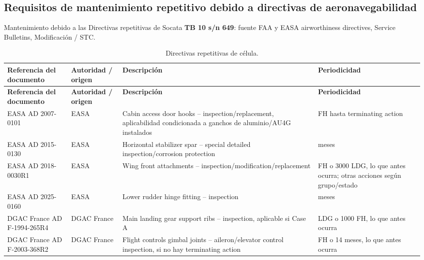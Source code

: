 \documentclass[12pt]{article}
\newcommand{\FH}{FH}
\newcommand{\LDG}{LDG}
\begin{document}
\subsection{Requisitos de mantenimiento repetitivo debido a directivas de aeronavegabilidad}
\label{subsec:ads}

Mantenimiento debido a las Directivas repetitivas de Socata \textbf{TB 10 s/n 649}: fuente FAA y EASA airworthiness directives, Service Bulletins, Modificación / STC.

\begingroup
\scriptsize
\setlength{\tabcolsep}{3pt}
\renewcommand{\arraystretch}{1.18}
\begin{longtable}{|>{\raggedright\arraybackslash}p{}|>{\raggedright\arraybackslash}p{}|>{\raggedright\arraybackslash}p{}|>{\raggedright\arraybackslash}p{}|}
\caption{Directivas repetitivas de célula.}
\label{tab:ad-celula}\\
\hline
\textbf{Referencia del documento} & \textbf{Autoridad / origen} & \textbf{Descripción} & \textbf{Periodicidad} \\
\hline
\endfirsthead
\hline
\textbf{Referencia del documento} & \textbf{Autoridad / origen} & \textbf{Descripción} & \textbf{Periodicidad} \\
\hline
\endhead
EASA AD 2007-0101 & EASA & Cabin access door hooks -- inspection/replacement, aplicabilidad condicionada a ganchos de aluminio/AU4G instalados & 110 \FH{} hasta terminating action \\
\hline
EASA AD 2015-0130 & EASA & Horizontal stabilizer spar -- special detailed inspection/corrosion protection & 72 meses \\
\hline
EASA AD 2018-0030R1 & EASA & Wing front attachments -- inspection/modification/replacement & 2000 \FH{} o 3000 \LDG, lo que antes ocurra; otras acciones según grupo/estado \\
\hline
EASA AD 2025-0160 & EASA & Lower rudder hinge fitting -- inspection & 12 meses \\
\hline
DGAC France AD F-1994-265R4 & DGAC France & Main landing gear support ribs -- inspection, aplicable si Case A & 1500 \LDG{} o 1000 \FH, lo que antes ocurra \\
\hline
DGAC France AD F-2003-368R2 & DGAC France & Flight controls gimbal joints -- aileron/elevator control inspection, si no hay terminating action & 110 \FH{} o 14 meses, lo que antes ocurra \\
\hline
\end{longtable}
\endgroup
\end{document}
